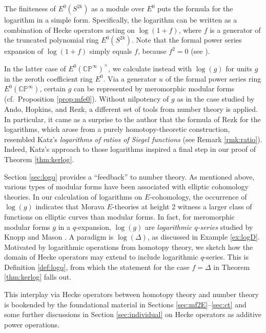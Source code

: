 \documentclass{gtpart}
\theoremstyle{definition}
\theoremstyle{remark}
\newcommand{\mb}[1]{\mathbb{#1}}
\newcommand{\BC}{{\mb C}}
\newcommand{\BP}{{\mb P}}
\renewcommand{\D}{\Delta}
\renewcommand{\=}{\approx}
\renewcommand{\-}{\sim}
\numberwithin{equation}{section}
\numberwithin{thm}{section}
\begin{document}
The finiteness of $E^0(S^{2 k})$ as a module over $E^0$ puts the formula for the logarithm in a simple form.  
Specifically, the logarithm can be written as a combination of Hecke operators acting on $\log (1 + f)$, 
where $f$ is a generator of the truncated polynomial ring $E^0(S^{2 k})$.  Note that the formal power series 
expansion of $\log (1 + f)$ simply equals $f$, because $f^2 = 0$ (see \cite[Proposition 4.8 and Example 4.9]{koandtmf}).  

In the latter case of $E^0(\BC\BP^\infty)^\times$, we calculate instead with $\log(g)$ for units $g$ in the zeroth coefficient ring $E^0$.  
Via a generator $u$ of the formal power series ring $E^0(\BC\BP^\infty)$, 
certain $g$ can be represented by meromorphic modular forms (cf.~Proposition \ref{prop:mfe0}).  
Without nilpotency of $g$ as in the case studied by Ando, Hopkins, and Rezk, 
a different set of tools from number theory is applied.  
In particular, it came as a surprise to the author that the formula of Rezk for the 
logarithms, which arose from a purely homotopy-theoretic construction, resembled Katz's 
{\em logarithms of ratios of Siegel functions} \cite[Section 10.1]{padicinterp} (see Remark \ref{rmk:ratio}).  
Indeed, Katz's approach to those logarithms inspired a final step in our proof of 
Theorem \ref{thm:kerlog}.  

Section \ref{sec:logq} provides a ``feedback'' to number theory.  
As mentioned above, various types of modular forms have been associated with elliptic cohomology theories.  
In our calculation of logarithms on $E$-cohomology, the occurrence of $\log(g)$ indicates that Morava 
$E$-theories at height 2 witness a larger class of functions on elliptic curves than modular forms.  In fact, 
for meromorphic modular forms $g$ in a $q$-expansion, $\log(g)$ 
are {\em logarithmic $q$-series} studied by Knopp and Mason \cite{KnoppMason}.  
A paradigm is $\log(\D)$, as discussed in Example \ref{ex:logD}.  Motivated 
by logarithmic operations from homotopy theory, we sketch how the domain of Hecke operators 
may extend to include logarithmic $q$-series.  This is Definition \ref{def:logq}, from which the 
statement for the case $f = \D$ in Theorem \ref{thm:kerlog} falls out.  

This interplay via Hecke operators between homotopy theory and number theory 
is bookended by the foundational material in Sections \ref{sec:mf2E}--\ref{sec:ct} 
and some further discussions in Section \ref{sec:individual} on Hecke operators as additive power operations.  
\end{document}
